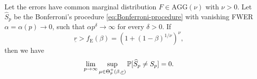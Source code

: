 \begin{theorem} \label{thm:sufficient}
Let the errors have common marginal distribution $F\in \text{AGG}(\nu)$ with $\nu>0$.  
Let $\widehat{S}_p$ be the Bonferroni's procedure \eqref{eq:Bonferroni-procedure} with vanishing FWER $\alpha = \alpha(p) \to 0$, such that %
$\alpha p^\delta\to \infty$ for every $\delta>0$.
If
\begin{equation} \label{eq:signal-above-boundary}
    \underline{r} > f_{\mathrm{E}}(\beta) = (1 + (1 - \beta)^{1/\nu})^\nu,
\end{equation}
then we have
\begin{equation} \label{eq:exact-supporot-recovery}
    \lim_{p\to\infty}\sup_{\mu\in\Theta_p^+(\beta, \underline{r})} \P[\widehat{S}_p \neq S_p] = 0.
\end{equation}
\end{theorem}
